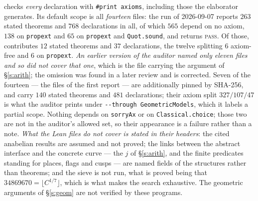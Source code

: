 \documentclass[11pt]{article}
\theoremstyle{plain}
\theoremstyle{definition}
\begin{document}
 checks \emph{every} declaration with
\texttt{\#print axioms}, including those the elaborator generates.  Its default scope
is all \emph{fourteen} files: the run of 2026-09-07 reports $263$ stated theorems and
$768$ declarations in all, of which $565$ depend on no axiom, $138$ on
\texttt{propext} and $65$ on \texttt{propext} and \texttt{Quot.sound}, and returns
\textsc{pass}.  Of those, 
contributes $12$ stated theorems and $37$ declarations, the twelve splitting $6$
axiom-free and $6$ on \texttt{propext}.  \emph{An earlier version of the auditor named
only eleven files and so did not cover that one}, which is the file carrying the
argument of \S\ref{s:arith}; the omission was found in a later review and is
corrected.  Seven of the fourteen --- the files of the first report --- are additionally
pinned by SHA-256, and carry $140$ stated theorems and $481$ declarations; their axiom
split $327/107/47$ is what the auditor prints under \texttt{-{}-through
GeometricModels}, which it labels a partial scope.  Nothing depends on
\texttt{sorryAx} or on \texttt{Classical.choice}; those two are not in the auditor's allowed set, so their
appearance is a failure rather than a note.  \emph{What the Lean files do not cover
is stated in their headers}: the cited anabelian results are assumed and not proved;
the links between the abstract interface and the concrete curve --- the $j$ of
\S\ref{s:arith}, and the finite predicates standing for places, flags and cusps ---
are named fields of the structures rather than theorems; and the sieve is not run,
what is proved being that $34869670=\lfloor C^{1/7}\rfloor$, which is what makes the
search exhaustive.  The geometric arguments of \S\ref{s:geom} are not
verified by these programs.
\end{document}
